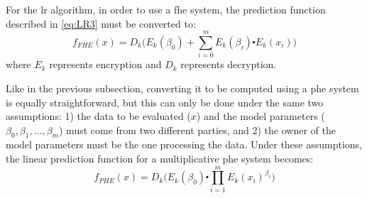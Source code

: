 For the \ac{lr} algorithm, in order to use a \ac{fhe} system, the prediction function described in \ref{eq:LR3} must be converted to:
\begin{equation}
\label{eq:he_lr1}
f_{FHE}(x) = D_k \Bigg( E_k(\beta_0) + \sum_{i=0}^m E_k(\beta_i) \centerdot E_k(x_i) \Bigg)
\end{equation}
where $E_k$ represents encryption and $D_k$ represents decryption.

Like in the previous subsection, converting it to be computed using a \ac{phe} system is equally straightforward, but this can only be done under the same two assumptions: 1) the data to be evaluated ($x$) and the model parameters ($\beta_0,\beta_1,\ldots,\beta_m$) must come from two different parties, and 2) the owner of the model parameters must be the one processing the data. Under these assumptions, the linear prediction function for a multiplicative \ac{phe} system becomes:
\begin{equation}
\label{eq:he_lr2}
f_{PHE}(x) = D_k \Bigg(E_k(\beta_0) \centerdot \prod_{i=1}^m E_k(x_i)^{\beta_i}         \Bigg)
\end{equation}